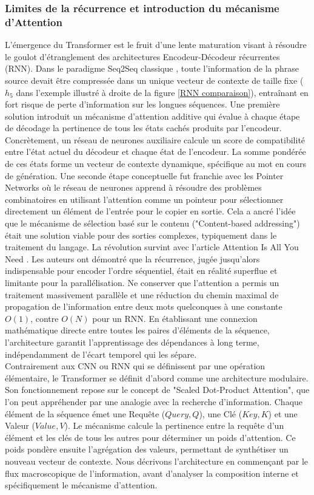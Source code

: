 \subsubsection{Limites de la récurrence et introduction du mécanisme d'Attention}
L'émergence du Transformer est le fruit d'une lente maturation visant à résoudre le goulot d'étranglement des architectures Encodeur-Décodeur récurrentes (RNN). Dans le paradigme Seq2Seq classique \cite{sutskever_sequence_2014}, toute l'information de la phrase source devait être compressée dans un unique vecteur de contexte de taille fixe ($h_5$ dans l'exemple illustré à droite de la figure \ref{RNN comparaison}), entraînant en fort risque de perte d'information sur les longues séquences. Une première solution \cite{bahdanau_neural_2014} introduit un mécanisme d'attention additive qui évalue à chaque étape de décodage la pertinence de tous les états cachés produits par l'encodeur. Concrètement, un réseau de neurones auxiliaire calcule un score de compatibilité entre l'état actuel du décodeur et chaque état de l'encodeur. La somme pondérée de ces états forme un vecteur de contexte dynamique, spécifique au mot en cours de génération. Une seconde étape conceptuelle fut franchie avec les Pointer Networks \cite{vinyals_pointer_2015} où le réseau de neurones apprend à résoudre des problèmes combinatoires en utilisant l'attention comme un pointeur pour sélectionner directement un élément de l’entrée pour le copier en sortie. Cela a ancré l'idée que le mécanisme de sélection basé sur le contenu ("Content-based addressing") était une solution viable pour des sorties complexes, typiquement dans le traitement du langage. La révolution survint avec l'article Attention Is All You Need \cite{vaswani_attention_2017}. Les auteurs ont démontré que la récurrence, jugée jusqu'alors indispensable pour encoder l'ordre séquentiel, était en réalité superflue et limitante pour la parallélisation. Ne conserver que l'attention a permis un traitement massivement parallèle et une réduction du chemin maximal de propagation de l'information entre deux mots quelconques à une constante $O(1)$, contre $O(N)$ pour un RNN. En établissant une connexion mathématique directe entre toutes les paires d'éléments de la séquence, l'architecture garantit l'apprentissage des dépendances à long terme, indépendamment de l'écart temporel qui les sépare.\\

Contrairement aux CNN ou RNN qui se définissent par une opération élémentaire, le Transformer se définit d'abord comme une architecture modulaire. Son fonctionnement repose sur le concept de "Scaled Dot-Product Attention", que l'on peut appréhender par une analogie avec la recherche d'information. Chaque élément de la séquence émet une Requête ($Query, Q$), une Clé ($Key, K$) et une Valeur ($Value, V$). Le mécanisme calcule la pertinence entre la requête d'un élément et les clés de tous les autres pour déterminer un poids d'attention. Ce poids pondère ensuite l'agrégation des valeurs, permettant de synthétiser un nouveau vecteur de contexte. Nous décrivons l’architecture en commençant par le flux macroscopique de l'information, avant d'analyser la composition interne et spécifiquement le mécanisme d’attention.

